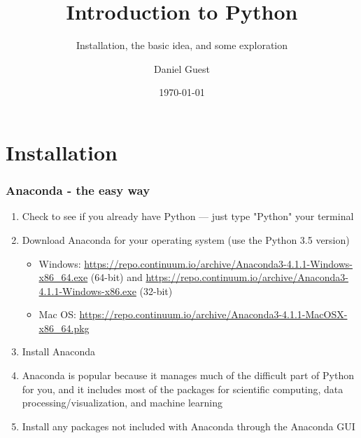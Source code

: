 \documentclass{beamer}\usepackage[]{graphicx}\usepackage[]{color}
\title{Introduction to Python}
\subtitle{Installation, the basic idea, and some exploration}
\author{Daniel Guest}
\date{\today}
\begin{document}
\maketitle

\tableofcontents

\section{Installation}

\begin{frame}
\frametitle{Anaconda - the easy way}

\begin{enumerate}
	\item Check to see if you already have Python --- just type "Python" your terminal

	\item Download Anaconda for your operating system (use the Python 3.5 version)

	\begin{itemize}

		\item Windows: \url{https://repo.continuum.io/archive/Anaconda3-4.1.1-Windows-x86_64.exe} (64-bit) and \url{https://repo.continuum.io/archive/Anaconda3-4.1.1-Windows-x86.exe} (32-bit)
			
		\item Mac OS: \url{https://repo.continuum.io/archive/Anaconda3-4.1.1-MacOSX-x86_64.pkg}
	\end{itemize}
	\item Install Anaconda

	\item Anaconda is popular because it manages much of the difficult part of Python for you, and it includes most of the packages for scientific computing, data processing/visualization, and machine learning

	\item Install any packages not included with Anaconda through the Anaconda GUI
\end{enumerate}

\end{frame}
\end{document}
